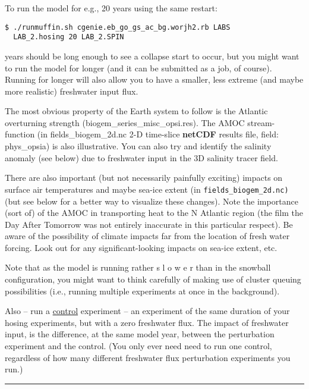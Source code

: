 \documentclass[11pt,fleqn]{book} %
\begin{document}
To run the model for e.g., 20 years using the same restart:

\vspace{-2mm}
\begin{verbatim}
$ ./runmuffin.sh cgenie.eb_go_gs_ac_bg.worjh2.rb LABS
  LAB_2.hosing 20 LAB_2.SPIN
\end{verbatim}
\vspace{-2mm}

 years should be long enough to see a collapse start to occur, but you might want to run the model for longer (and it can be submitted as a job, of course). Running for longer will also allow you to have a smaller, less extreme (and maybe more realistic) freshwater input flux.

The most obvious property of the Earth system to follow is the Atlantic overturning strength (\textsf{\footnotesize biogem\_series\_misc\_opsi.res}). The AMOC stream-function (in \textsf{\footnotesize fields\_biogem\_2d.nc} 2-D time-slice \textbf{netCDF} results file, field: \textsf{\footnotesize phys\_opsia}) is also illustrative. You can also try and identify the salinity anomaly (see below) due to freshwater input in the 3D salinity tracer field.

There are also important (but not necessarily painfully exciting) impacts on surface air temperatures and maybe sea-ice extent (in \texttt{fields\_biogem\_2d.nc)} (but see below for a better way to visualize these changes). Note the importance (sort of) of the AMOC in transporting heat to the N Atlantic region (the film the Day After Tomorrow was not entirely inaccurate in this particular respect). Be aware of the possibility of climate impacts far from the location of fresh water forcing. Look out for any significant-looking impacts on sea-ice extent, etc.

Note that as the model is running rather s l o w e r than in the snowball configuration, you might want to think carefully of making use of cluster queuing possibilities (i.e., running multiple experiments at once in the background).

Also -- run a \uline{control} experiment -- an experiment of the same duration of your hosing experiments, but with a zero freshwater flux. The impact of freshwater input, is the difference, at the same model year, between the perturbation experiment and the control. (You only ever need need to run one control, regardless of how many different freshwater flux perturbation experiments  you run.) 

\vspace{1mm}
\noindent\rule{4cm}{0.5pt}
\vspace{2mm}
\end{document}
